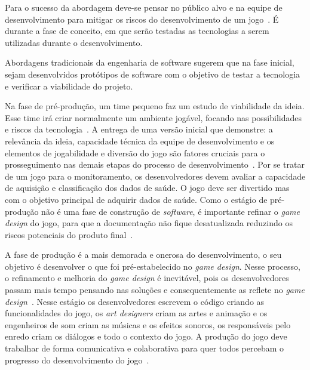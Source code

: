 Para o sucesso da abordagem deve-se pensar no público alvo e na equipe de desenvolvimento para mitigar os riscos do desenvolvimento de um jogo~\cite{fullerton2008game}. É durante a fase de conceito, em que serão testadas as tecnologias a serem utilizadas durante o desenvolvimento.

Abordagens tradicionais da engenharia de software sugerem que na fase inicial, sejam desenvolvidos protótipos de software com o objetivo de testar a tecnologia e verificar a viabilidade do projeto.




Na fase de pré-produção, um time pequeno faz um estudo de viabilidade da ideia. Esse time irá criar normalmente um ambiente jogável, focando nas possibilidades e riscos da tecnologia~\cite{fullerton2008game}.  A entrega de uma versão inicial que demonstre: a relevância da ideia, capacidade técnica da equipe de desenvolvimento  e os elementos de jogabilidade e diversão do jogo  são fatores cruciais para o prosseguimento nas demais etapas do processo de desenvolvimento~\cite{fullerton2008game}.
Por se tratar de um jogo para o monitoramento, os desenvolvedores devem avaliar a capacidade de aquisição e classificação dos dados de saúde. O jogo deve ser divertido mas com o objetivo principal de adquirir dados de saúde.
Como o estágio de pré-produção não é uma fase de construção de \textit{software}, é importante refinar o \textit{game design} do jogo, para que a documentação não fique desatualizada reduzindo os riscos potenciais do produto final~\cite{fullerton2008game}.

A fase de produção é a mais demorada e onerosa do desenvolvimento, o  seu objetivo é desenvolver o que foi pré-estabelecido no \textit{game design}. Nesse processo, o refinamento e melhoria do \textit{game design} é inevitável, pois os desenvolvedores passam mais tempo pensando nas soluções e consequentemente as reflete no \textit{game design}~\cite{fullerton2008game}. Nesse estágio os desenvolvedores escrevem o código criando as funcionalidades do jogo, os \textit{art designers} criam as artes e animação e os engenheiros de som criam as músicas e os efeitos sonoros, os responsáveis pelo enredo criam os diálogos e todo o contexto do jogo. A produção do jogo deve trabalhar de forma comunicativa e colaborativa para quer todos percebam o progresso do desenvolvimento do jogo~\cite{fullerton2008game}.


